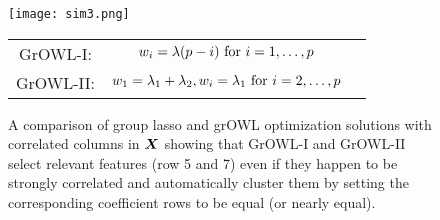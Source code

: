 \begin{figure}[!t]
    \centering
    \texttt{[image: sim3.png]}
    \qquad
    \begin{tabular}[b]{ccc}
    \hline
    	GrOWL-I:	& $w_i = \lambda (p - i) \textnormal{ for } i = 1, \dots,  p $   &\\ 
	GrOWL-II:	& $w_1 = \lambda_1 +  \lambda_2, w_i = \lambda_1 \textnormal{ for } i = 2, \dots,  p$  &\\ \hline
    \end{tabular}
    \caption{A comparison of group lasso and grOWL optimization solutions with correlated columns in $\boldsymbol{X}$ showing that GrOWL-I and GrOWL-II select relevant features (row 5 and 7) even if they happen to be strongly correlated and automatically cluster them by setting the corresponding coefficient rows to be equal (or nearly equal).}
    \label{Fig:sim}
  \end{figure}

